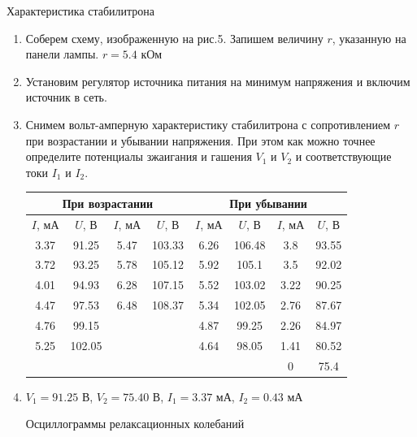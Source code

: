 \documentclass[a4paper, 12pt]{article}
\begin{document}
    \begin{center}
        Характеристика стабилитрона
    \end{center}

    \begin{enumerate}
        \item Соберем схему, изображенную на рис.5. Запишем величину $r$, указанную на панели лампы. $r = 5.4$ кОм
        \item Установим регулятор источника питания на минимум напряжения и включим источник в сеть.
        \item Снимем вольт-амперную характеристику стабилитрона с сопротивлением $r$ при возрастании и убывании напряжения. При этом как можно точнее определите потенциалы зжаигания и гашения $V_1$ и $V_2$ и соответствующие токи $I_1$ и $I_2$.\\
        
        \begin{tabular}{|c|c|c|c|c|c|c|c|}
            \hline
            \multicolumn{4}{|c|}{При возрастании} & \multicolumn{4}{|c|}{При убывании}\\ \hline
            $I$, мА & $U$, В & $I$, мА & $U$, В & $I$, мА & $U$, В & $I$, мА & $U$, В \\ \hline 
            3.37 & 91.25 & 5.47 & 103.33 & 6.26 & 106.48 & 3.8 & 93.55 \\ \hline
            3.72 & 93.25 & 5.78 & 105.12 & 5.92 & 105.1 & 3.5 & 92.02\\ \hline
            4.01 & 94.93 & 6.28 & 107.15 & 5.52 & 103.02 & 3.22 & 90.25 \\ \hline
            4.47 & 97.53 & 6.48 & 108.37 & 5.34 & 102.05 & 2.76 & 87.67\\ \hline
            4.76 & 99.15 &  &  & 4.87 & 99.25 & 2.26 & 84.97\\ \hline
            5.25 & 102.05 & & & 4.64 & 98.05 & 1.41 & 80.52\\ \hline
            & & & & & & 0 & 75.4 \\ \hline
        \end{tabular}

        \item $V_1 = 91.25$ В, $V_2 = 75.40$ В, $I_1 = 3.37$ мА, $I_2 = 0.43$ мА
        
        \begin{center}
            Осциллограммы релаксационных колебаний
        \end{center}


\end{enumerate}
\end{document}
